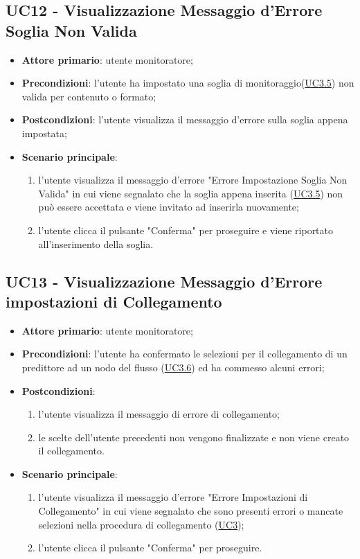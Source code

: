 
		\label{par:UC12}
	\subsection{UC12 - Visualizzazione Messaggio d'Errore Soglia Non Valida}
		\begin{itemize}
			\item\textbf{Attore primario}: utente monitoratore;
			\item\textbf{Precondizioni}: l’utente ha impostato una soglia di monitoraggio(\hyperref[par:UC3.5]{UC3.5}) non valida per contenuto o formato;
			\item\textbf{Postcondizioni}: l’utente visualizza il messaggio d'errore sulla soglia appena impostata;		
			\item\textbf{Scenario principale}: 
				\begin{enumerate} 
					\item l’utente visualizza il messaggio d'errore "Errore Impostazione Soglia Non Valida" in cui viene segnalato che la soglia appena inserita (\hyperref[par:UC3.5]{UC3.5}) non può essere accettata e viene invitato ad inserirla nuovamente;
					\item l'utente clicca il pulsante "Conferma" per proseguire e viene riportato all'inserimento della soglia.		
				\end{enumerate}		
		\end{itemize}


	\label{par:UC13}
	\subsection{UC13 - Visualizzazione Messaggio d'Errore impostazioni di Collegamento}
		\begin{itemize}
			\item\textbf{Attore primario}: utente monitoratore;
			\item\textbf{Precondizioni}: l’utente ha confermato le selezioni per il collegamento di un predittore ad un nodo del flusso (\hyperref[par:UC3.6]{UC3.6}) ed ha commesso alcuni errori;
			\item\textbf{Postcondizioni}: 
				\begin{enumerate}
					\item l’utente visualizza il messaggio di errore di collegamento;
					\item le scelte dell'utente precedenti non vengono finalizzate e non viene creato il collegamento. 
				\end{enumerate}		
			\item\textbf{Scenario principale}: 
				\begin{enumerate} 
					\item l’utente visualizza il messaggio d'errore "Errore Impostazioni di Collegamento" in cui viene segnalato che sono presenti errori o mancate selezioni nella procedura di collegamento (\hyperref[par:UC3]{UC3});
					\item l'utente clicca il pulsante "Conferma" per proseguire.		
				\end{enumerate}		
		\end{itemize}

